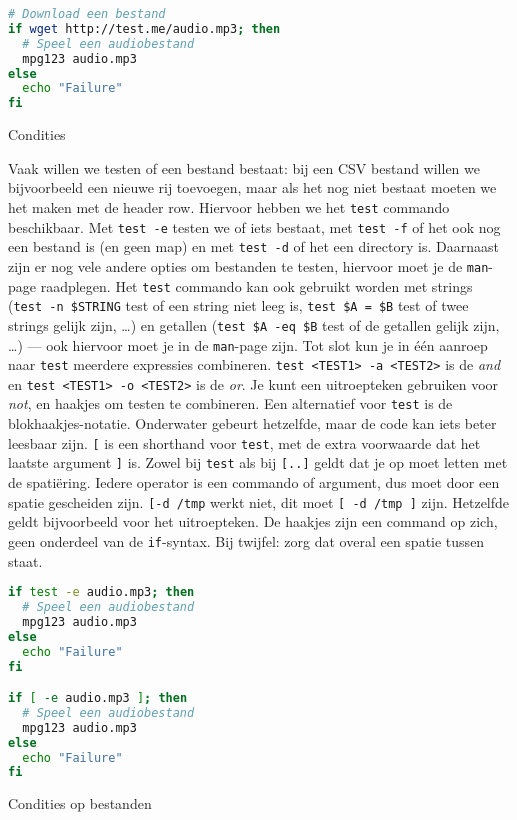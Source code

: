 \begin{listing}
\begin{lstlisting}[language=bash]
# Download een bestand
if wget http://test.me/audio.mp3; then
  # Speel een audiobestand
  mpg123 audio.mp3
else
  echo "Failure"
fi
\end{lstlisting}
\caption{Condities}
\end{listing}

Vaak willen we testen of een bestand bestaat: bij een CSV bestand willen we bijvoorbeeld een nieuwe rij toevoegen, maar als het nog niet bestaat moeten we het maken met de header row. Hiervoor hebben we het \texttt{test} commando beschikbaar. Met \texttt{test\ -e} testen we of iets bestaat, met \texttt{test\ -f} of het ook nog een bestand is (en geen map) en met \texttt{test\ -d} of het een directory is. Daarnaast zijn er nog vele andere opties om bestanden te testen, hiervoor moet je de \texttt{man}-page raadplegen. Het \texttt{test} commando kan ook gebruikt worden met strings (\texttt{test\ -n\ \$STRING} test of een string niet leeg is, \texttt{test\ \$A\ =\ \$B} test of twee strings gelijk zijn, \ldots) en getallen (\texttt{test\ \$A\ -eq\ \$B} test of de getallen gelijk zijn, \ldots) --- ook hiervoor moet je in de \texttt{man}-page zijn. Tot slot kun je in één aanroep naar \texttt{test} meerdere expressies combineren. \texttt{test\ \textless{}TEST1\textgreater{}\ -a\ \textless{}TEST2\textgreater{}} is de \emph{and} en \texttt{test\ \textless{}TEST1\textgreater{}\ -o\ \textless{}TEST2\textgreater{}} is de \emph{or}. Je kunt een uitroepteken gebruiken voor \emph{not}, en haakjes om testen te combineren. Een alternatief voor \texttt{test} is de blokhaakjes-notatie. Onderwater gebeurt hetzelfde, maar de code kan iets beter leesbaar zijn. \texttt{{[}} is een shorthand voor \texttt{test}, met de extra voorwaarde dat het laatste argument \texttt{{]}} is. Zowel bij \texttt{test} als bij \texttt{{[}..{]}} geldt dat je op moet letten met de spatiëring. Iedere operator is een commando of argument, dus moet door een spatie gescheiden zijn. \texttt{{[}-d\ \textquotesingle{}/tmp\textquotesingle{}{]}} werkt niet, dit moet \texttt{{[}\ -d\ \textquotesingle{}/tmp\textquotesingle{}\ {]}} zijn. Hetzelfde geldt bijvoorbeeld voor het uitroepteken. De haakjes zijn een command op zich, geen onderdeel van de \texttt{if}-syntax. Bij twijfel: zorg dat overal een spatie tussen staat.

\begin{listing}
\begin{lstlisting}[language=bash]
if test -e audio.mp3; then
  # Speel een audiobestand
  mpg123 audio.mp3
else
  echo "Failure"
fi

if [ -e audio.mp3 ]; then
  # Speel een audiobestand
  mpg123 audio.mp3
else
  echo "Failure"
fi
\end{lstlisting}
\caption{Condities op bestanden}
\end{listing}

